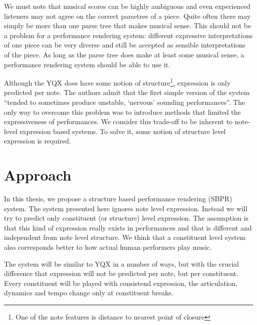 \documentclass[a4paper,10pt]{article}
\begin{document}
We must note that musical scores can be highly ambiguous and even experienced listeners may not agree on the correct parsetree of a piece. Quite often there may simply be more than one parse tree that makes musical sense. This should not be a problem for a performance rendering system: different expressive interpretations of one piece can be very diverse and still be accepted as sensible interpretations of the piece. As long as the parse tree does make at least some musical sense, a performance rendering system should be able to use it.

Although the YQX does have some notion of structure\footnote{One of the note features is distance to nearest point of closure}, expression is only predicted per note. The authors admit that the first simple version of the system ``tended to sometimes produce unstable, `nervous' sounding performances''. The only way to overcome this problem was to introduce methods that limited the expressiveness of performances. We consider this trade-off to be inherent to note-level expression based systems. To solve it, some notion of structure level expression is required.


\section{Approach}
\label{sec:approach}

In this thesis, we propose a structure based performance rendering (SBPR) system. The system presented here ignores note level expression. Instead we will try to predict only constituent (or structure) level expression. The assumption is that this kind of expression really exists in performances and that is different and independent from note level structure. We think that a constituent level system also corresponds better to how actual human performers play music. 


The system will be similar to YQX in a number of ways, but with the crucial difference that expression will not be predicted per note, but per constituent. Every constituent will be played with consistend expression, the articulation, dynamics and tempo change only at constituent breaks.
\end{document}
